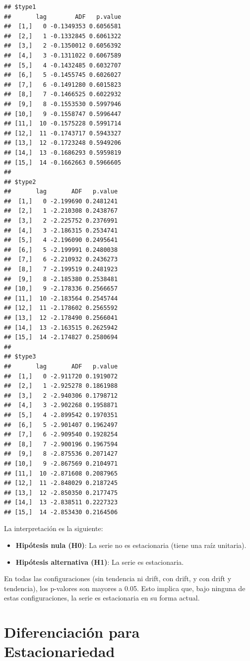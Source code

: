 \documentclass[
]{book}
\begin{document}
\begin{verbatim}
## $type1
##       lag        ADF   p.value
##  [1,]   0 -0.1349353 0.6056581
##  [2,]   1 -0.1332845 0.6061322
##  [3,]   2 -0.1350012 0.6056392
##  [4,]   3 -0.1311022 0.6067589
##  [5,]   4 -0.1432485 0.6032707
##  [6,]   5 -0.1455745 0.6026027
##  [7,]   6 -0.1491280 0.6015823
##  [8,]   7 -0.1466525 0.6022932
##  [9,]   8 -0.1553530 0.5997946
## [10,]   9 -0.1558747 0.5996447
## [11,]  10 -0.1575228 0.5991714
## [12,]  11 -0.1743717 0.5943327
## [13,]  12 -0.1723248 0.5949206
## [14,]  13 -0.1686293 0.5959819
## [15,]  14 -0.1662663 0.5966605
## 
## $type2
##       lag       ADF   p.value
##  [1,]   0 -2.199690 0.2481241
##  [2,]   1 -2.210308 0.2438767
##  [3,]   2 -2.225752 0.2376991
##  [4,]   3 -2.186315 0.2534741
##  [5,]   4 -2.196090 0.2495641
##  [6,]   5 -2.199991 0.2480038
##  [7,]   6 -2.210932 0.2436273
##  [8,]   7 -2.199519 0.2481923
##  [9,]   8 -2.185380 0.2538481
## [10,]   9 -2.178336 0.2566657
## [11,]  10 -2.183564 0.2545744
## [12,]  11 -2.178602 0.2565592
## [13,]  12 -2.178490 0.2566041
## [14,]  13 -2.163515 0.2625942
## [15,]  14 -2.174827 0.2580694
## 
## $type3
##       lag       ADF   p.value
##  [1,]   0 -2.911720 0.1919072
##  [2,]   1 -2.925278 0.1861988
##  [3,]   2 -2.940306 0.1798712
##  [4,]   3 -2.902268 0.1958871
##  [5,]   4 -2.899542 0.1970351
##  [6,]   5 -2.901407 0.1962497
##  [7,]   6 -2.909540 0.1928254
##  [8,]   7 -2.900196 0.1967594
##  [9,]   8 -2.875536 0.2071427
## [10,]   9 -2.867569 0.2104971
## [11,]  10 -2.871608 0.2087965
## [12,]  11 -2.848029 0.2187245
## [13,]  12 -2.850350 0.2177475
## [14,]  13 -2.838511 0.2227323
## [15,]  14 -2.853430 0.2164506
\end{verbatim}

La interpretación es la siguiente:

\begin{itemize}
\item
  \textbf{Hipótesis nula (H0)}: La serie no es estacionaria (tiene una raíz unitaria).
\item
  \textbf{Hipótesis alternativa (H1)}: La serie es estacionaria.
\end{itemize}

En todas las configuraciones (sin tendencia ni drift, con drift, y con drift y tendencia), los p-valores son mayores a 0.05. Esto implica que, bajo ninguna de estas configuraciones, la serie es estacionaria en su forma actual.

\section{Diferenciación para Estacionariedad}\label{diferenciaciuxf3n-para-estacionariedad}
\end{document}
